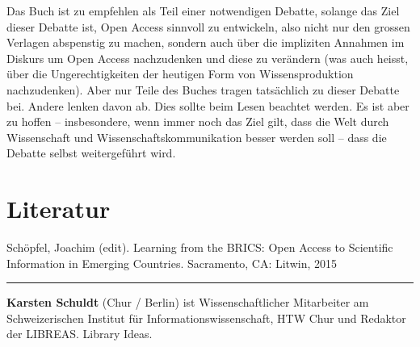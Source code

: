 \documentclass[a4paper,
fontsize=11pt,
oneside,
numbers=noperiodatend,
parskip=half-,
bibliography=totoc,
final
]{scrartcl}
\begin{document}
Das Buch ist zu empfehlen als Teil einer notwendigen Debatte, solange
das Ziel dieser Debatte ist, Open Access sinnvoll zu entwickeln, also
nicht nur den grossen Verlagen abspenstig zu machen, sondern auch über
die impliziten Annahmen im Diskurs um Open Access nachzudenken und diese
zu verändern (was auch heisst, über die Ungerechtigkeiten der heutigen
Form von Wissensproduktion nachzudenken). Aber nur Teile des Buches
tragen tatsächlich zu dieser Debatte bei. Andere lenken davon ab. Dies
sollte beim Lesen beachtet werden. Es ist aber zu hoffen --
insbesondere, wenn immer noch das Ziel gilt, dass die Welt durch
Wissenschaft und Wissenschaftskommunikation besser werden soll -- dass
die Debatte selbst weitergeführt wird.

\section{Literatur}

Schöpfel, Joachim (edit). Learning from the BRICS: Open Access to
Scientific Information in Emerging Countries. Sacramento, CA: Litwin,
2015

\begin{center}\rule{0.5\linewidth}{\linethickness}\end{center}

\textbf{Karsten Schuldt} (Chur / Berlin) ist Wissenschaftlicher
Mitarbeiter am Schweizerischen Institut für Informationswissenschaft,
HTW Chur und Redaktor der LIBREAS. Library Ideas.
\end{document}
